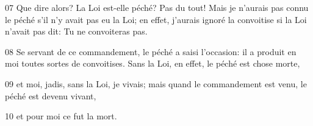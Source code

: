 
07 Que dire alors? La Loi est-elle péché? Pas du tout! Mais je n’aurais pas connu le péché s’il n’y avait pas eu la Loi; en effet, j’aurais ignoré la convoitise si la Loi n’avait pas dit: Tu ne convoiteras pas.

08 Se servant de ce commandement, le péché a saisi l’occasion: il a produit en moi toutes sortes de convoitises. Sans la Loi, en effet, le péché est chose morte,

09 et moi, jadis, sans la Loi, je vivais; mais quand le commandement est venu, le péché est devenu vivant,

10 et pour moi ce fut la mort.